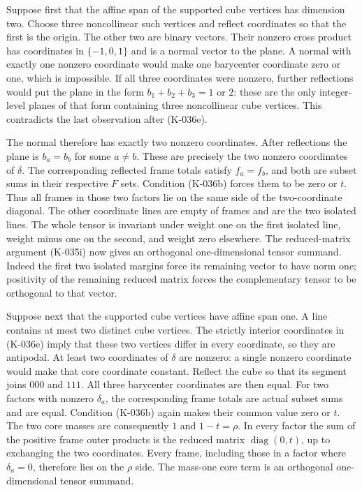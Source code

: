 Suppose first that the affine span of the supported cube
vertices has dimension two.  Choose three noncollinear such
vertices and reflect coordinates so that the first is the
origin.  The other two are binary vectors.  Their nonzero cross
product has coordinates in $\{-1,0,1\}$ and is a normal vector
to the plane.  A normal with exactly one nonzero coordinate
would make one barycenter coordinate zero or one, which is
impossible.  If all three coordinates were nonzero, further
reflections would put the plane in the form
$b_1+b_2+b_3=1$ or $2$: these are the only integer-level
planes of that form containing three noncollinear cube vertices.
This contradicts the last observation after (K-036e).

The normal therefore has exactly two nonzero coordinates.  After
reflections the plane is $b_a=b_b$ for some $a\ne b$.  These
are precisely the two nonzero coordinates of $\delta$.
The corresponding reflected frame totals satisfy $f_a=f_b$,
and both are subset sums in their respective $F$ sets.
Condition (K-036b) forces them to be zero or $t$.  Thus all
frames in those two factors lie on the same side of the
two-coordinate diagonal.  The other coordinate lines are empty
of frames and are the two isolated lines.  The whole tensor
is invariant under weight one on the first isolated line,
weight minus one on the second, and weight zero elsewhere.
The reduced-matrix argument (K-035i) now gives an orthogonal
one-dimensional tensor summand.  Indeed the first two isolated
margins force its remaining vector to have norm one; positivity
of the remaining reduced matrix forces the complementary tensor
to be orthogonal to that vector.

Suppose next that the supported cube vertices have affine span
one.  A line contains at most two distinct cube vertices.  The
strictly interior coordinates in (K-036e) imply that these two
vertices differ in every coordinate, so they are antipodal.
At least two coordinates of $\delta$ are nonzero: a single
nonzero coordinate would make that core coordinate constant.
Reflect the cube so that its segment joins $000$ and $111$.
All three barycenter coordinates are then equal.  For two
factors with nonzero $\delta_a$, the corresponding frame
totals are actual subset sums and are equal.  Condition
(K-036b) again makes their common value zero or $t$.
The two core masses are consequently $1$ and $1-t=\rho$.
In every factor the sum of the positive frame outer products
is the reduced matrix $\operatorname{diag}(0,t)$, up to
exchanging the two coordinates.  Every frame, including those
in a factor where $\delta_a=0$, therefore lies on the
$\rho$ side.  The mass-one core term is an orthogonal
one-dimensional tensor summand.


